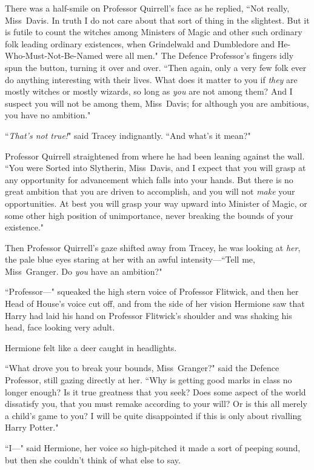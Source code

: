 There was a half-smile on Professor Quirrell's face as he replied, ``Not really, Miss~Davis. In truth I do not care about that sort of thing in the slightest. But it is futile to count the witches among Ministers of Magic and other such ordinary folk leading ordinary existences, when Grindelwald and Dumbledore and He-Who-Must-Not-Be-Named were all men." The Defence Professor's fingers idly spun the button, turning it over and over. ``Then again, only a very few folk ever do anything interesting with their lives. What does it matter to you if \emph{they} are mostly witches or mostly wizards, so long as \emph{you} are not among them? And I suspect you will not be among them, Miss~Davis; for although you are ambitious, you have no ambition."

``\emph{That's not true!}" said Tracey indignantly. ``And what's it mean?"

Professor Quirrell straightened from where he had been leaning against the wall. ``You were Sorted into Slytherin, Miss~Davis, and I expect that you will grasp at any opportunity for advancement which falls into your hands. But there is no great ambition that you are driven to accomplish, and you will not \emph{make} your opportunities. At best you will grasp your way upward into Minister of Magic, or some other high position of unimportance, never breaking the bounds of your existence."

Then Professor Quirrell's gaze shifted away from Tracey, he was looking at \emph{her}, the pale blue eyes staring at her with an awful intensity—``Tell me, Miss~Granger. Do \emph{you} have an ambition?"

``Professor—" squeaked the high stern voice of Professor Flitwick, and then her Head of House's voice cut off, and from the side of her vision Hermione saw that Harry had laid his hand on Professor Flitwick's shoulder and was shaking his head, face looking very adult.

Hermione felt like a deer caught in headlights.

``What drove you to break your bounds, Miss~Granger?" said the Defence Professor, still gazing directly at her. ``Why is getting good marks in class no longer enough? Is it true greatness that you seek? Does some aspect of the world dissatisfy you, that you must remake according to your will? Or is this all merely a child's game to you? I will be quite disappointed if this is only about rivalling Harry Potter."

``I—" said Hermione, her voice so high-pitched it made a sort of peeping sound, but then she couldn't think of what else to say.

